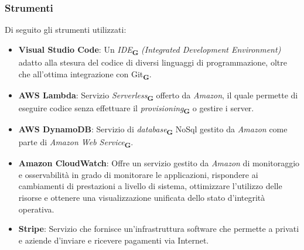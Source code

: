\subsubsection{Strumenti}
Di seguito gli strumenti utilizzati:
\begin{itemize}
    \item \textbf{Visual Studio Code}: Un \textit{IDE}\textsubscript{\textbf{G}} \textit{(Integrated Development Environment)} adatto alla stesura del codice di diversi linguaggi di programmazione, oltre che all'ottima integrazione con Git\textsubscript{\textbf{G}}.
    \item \textbf{AWS Lambda}: Servizio \textit{Serverless}\textsubscript{\textbf{G}} offerto da \textit{Amazon}, il quale permette di eseguire codice senza effettuare il \textit{provisioning}\textsubscript{\textbf{G}} o gestire i server.
    \item \textbf{AWS DynamoDB}: Servizio di \textit{database}\textsubscript{\textbf{G}} NoSql gestito da \textit{Amazon} come parte di \textit{Amazon Web Service}\textsubscript{\textbf{G}}.
    \item \textbf{Amazon CloudWatch}: Offre un servizio gestito da \textit{Amazon} di monitoraggio e osservabilità in grado di monitorare le applicazioni, rispondere ai cambiamenti di prestazioni a livello di sistema, ottimizzare l'utilizzo delle risorse e ottenere una visualizzazione unificata dello stato d'integrità operativa.
    \item \textbf{Stripe}: Servizio che fornisce un'infrastruttura software che permette a privati e aziende d'inviare e ricevere pagamenti via Internet.
\end{itemize}

